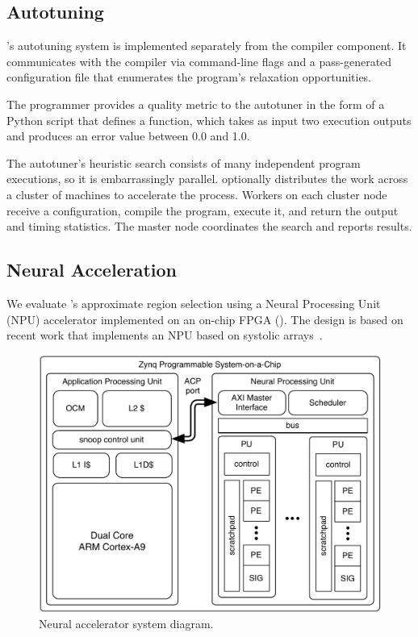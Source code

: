 \subsection{Autotuning}

\sysname's autotuning system is implemented separately
from the compiler component. It communicates with the compiler via
command-line flags and a pass-generated configuration file that enumerates the
program's relaxation opportunities.

The programmer provides a quality metric to the autotuner in the form of a Python script that
defines a  function, which
takes as input two execution outputs and
produces an error value between 0.0 and 1.0.

The autotuner's heuristic search consists of many independent program
executions, so it is embarrassingly parallel.
\sysname
optionally distributes the work across a cluster of machines to accelerate the
process.  Workers on each cluster node receive a configuration, compile the
program, execute it, and return the output and timing statistics. The master
node coordinates the search and reports results.

\subsection{Neural Acceleration}
\label{sec:accelerator}

We evaluate \sysname's approximate region selection using a Neural Processing
Unit (NPU) accelerator implemented on an on-chip FPGA ().  The
design is based on recent work that implements an NPU based on systolic
arrays~\cite{npu, snnap}.

\iffalse
\begin{figure}
    \centering
    \includegraphics[width=0.8\linewidth]{figs/npu.pdf}
    \vspace{-1.5ex}
    \caption{Neural accelerator system diagram.}
    \label{fig:snnap}
\end{figure}

